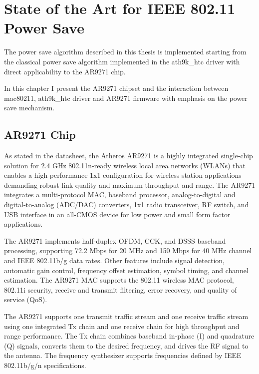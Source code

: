 \chapter{State of the Art for IEEE 802.11 Power Save}

The power save algorithm described in this thesis is implemented starting from the classical power save algorithm implemented in the ath9k_htc driver with direct applicability to the AR9271 chip.

In this chapter I present the AR9271 chipset and the interaction between mac80211, ath9k_htc driver and AR9271 firmware with emphasis on the power save mechanism.

\section{AR9271 Chip}
\label{sec:chip}

As stated in the datasheet, the Atheros AR9271 is a highly integrated single-chip solution for 2.4 GHz 802.11n-ready wireless local area networks (WLANs) that enables a high-performance 1x1 configuration for wireless station applications demanding robust link quality and maximum throughput and range. The AR9271 integrates a multi-protocol MAC, baseband processor, analog-to-digital and digital-to-analog (ADC/DAC) converters, 1x1 radio transceiver, RF switch, and USB interface in an all-CMOS device for low power and small form factor applications.


The AR9271 implements half-duplex OFDM, CCK, and DSSS baseband processing, supporting 72.2 Mbps for 20 MHz and 150 Mbps for 40 MHz channel and IEEE 802.11b/g data rates. Other features include signal detection, automatic gain control, frequency offset estimation, symbol timing, and channel estimation. The AR9271 MAC supports the 802.11 wireless MAC protocol, 802.11i security, receive and transmit filtering, error recovery, and quality of service (QoS).

The AR9271 supports one transmit traffic stream and one receive traffic stream using one integrated Tx chain and one receive chain for high throughput and range performance. The Tx chain combines baseband in-phase (I) and quadrature (Q) signals, converts them to the desired frequency, and drives the RF signal to the antenna. The frequency synthesizer supports frequencies defined by IEEE 802.11b/g/n specifications.

